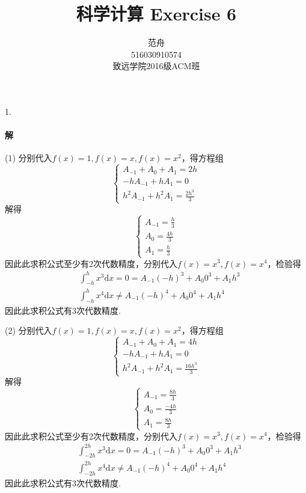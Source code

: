 \documentclass[12pt, a4paper]{article}
\title{科学计算 Exercise 6}
\author{范舟\\516030910574\\致远学院2016级ACM班}
\date{}
\theoremstyle{margin}
\newcommand{\rd}{\mathrm{d}}
\begin{document}
\maketitle

1. \paragraph{解} (1) 分别代入$f(x) = 1, f(x) = x, f(x) = x^2$，得方程组
\[\begin{cases}
A_{-1} + A_{0} + A_{1} = 2h \\
-hA_{-1} + hA_{1} = 0 \\
h^2A_{-1} + h^2A_{1} = \frac{2h^3}{3}
\end{cases}\]
解得
\[\begin{cases}
A_{-1} = \frac{h}{3} \\
A_{0} = \frac{4h}{3}\\
A_{1} = \frac{h}{3}
\end{cases}\]
因此此求积公式至少有2次代数精度，分别代入$f(x) = x^3, f(x) = x^4$，检验得
\[\begin{split}
& \int_{-h}^{h} x^3 \rd x = 0 = A_{-1}(-h)^3 + A_{0}0^3 + A_{1}h^3 \\
& \int_{-h}^{h} x^4 \rd x \ne A_{-1}(-h)^4 + A_{0}0^4 + A_{1}h^4
\end{split}\]
因此此求积公式有3次代数精度. 

(2) 分别代入$f(x) = 1, f(x) = x, f(x) = x^2$，得方程组
\[\begin{cases}
A_{-1} + A_{0} + A_{1} = 4h \\
-hA_{-1} + hA_{1} = 0 \\
h^2A_{-1} + h^2A_{1} = \frac{16h^3}{3}
\end{cases}\]
解得
\[\begin{cases}
A_{-1} = \frac{8h}{3} \\
A_{0} = \frac{-4h}{3}\\
A_{1} = \frac{8h}{3}
\end{cases}\]
因此此求积公式至少有2次代数精度，分别代入$f(x) = x^3, f(x) = x^4$，检验得
\[\begin{split}
& \int_{-2h}^{2h} x^3 \rd x = 0 = A_{-1}(-h)^3 + A_{0}0^3 + A_{1}h^3 \\
& \int_{-2h}^{2h} x^4 \rd x \ne A_{-1}(-h)^4 + A_{0}0^4 + A_{1}h^4
\end{split}\]
因此此求积公式有3次代数精度. 
\end{document}

